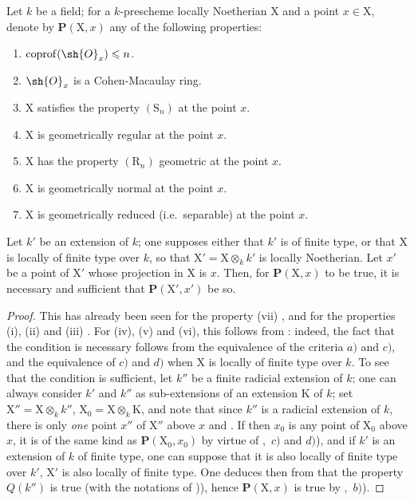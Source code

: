 \begin{corollary}[6.7.8]
\label{IV.6.7.8}
Let $k$ be a field; for a $k$-prescheme locally Noetherian $\mathrm{X}$ and a point $x\in\mathrm{X}$, denote by $\boldsymbol{P}(\mathrm{X},x)$ any of the following properties:
\begin{enumerate}[label=(\roman*)]
  \item $\operatorname{coprof}(\sh{O}_x)\leqslant n$.
  \item $\sh{O}_x$ is a Cohen-Macaulay ring.
  \item $\mathrm{X}$ satisfies the property $(\mathrm{S}_n)$ at the point $x$.
  \item $\mathrm{X}$ is geometrically regular at the point $x$.
  \item $\mathrm{X}$ has the property $(\mathrm{R}_n)$ geometric at the point $x$.
  \item $\mathrm{X}$ is geometrically normal at the point $x$.
  \item $\mathrm{X}$ is geometrically reduced (i.e.\ separable) at the point $x$.
\end{enumerate}
Let $k'$ be an extension of $k$; one supposes either that $k'$ is of finite type, or that $\mathrm{X}$ is locally of finite type over $k$, so that $\mathrm{X}'=\mathrm{X}\otimes_k k'$ is locally Noetherian. Let $x'$ be a point of $\mathrm{X}'$ whose projection in $\mathrm{X}$ is $x$. Then, for $\boldsymbol{P}(\mathrm{X},x)$ to be true, it is necessary and sufficient that $\boldsymbol{P}(\mathrm{X}',x')$ be so.
\end{corollary}

\begin{proof}
This has already been seen for the property (vii) , and for the properties (i), (ii) and (iii) . For (iv), (v) and (vi), this follows from : indeed, the fact that the condition is necessary follows from the equivalence of the criteria $a)$ and $c)$, and the equivalence of $c)$ and $d)$ when $\mathrm{X}$ is locally of finite type over $k$. To see that the condition is sufficient, let $k''$ be a finite radicial extension of $k$; one can always consider $k'$ and $k''$ as sub-extensions of an extension $\mathrm{K}$ of $k$; set $\mathrm{X}''=\mathrm{X}\otimes_k k''$, $\mathrm{X}_0=\mathrm{X}\otimes_k\mathrm{K}$, and note that since $k''$ is a radicial extension of $k$, there is only \emph{one} point $x''$ of $\mathrm{X}''$ above $x$  and . If then $x_0$ is any point of $\mathrm{X}_0$ above $x$, it is of the same kind as $\boldsymbol{P}(\mathrm{X}_0,x_0)$ by virtue of ,~$c)$ and $d)$), and if $k'$ is an extension of $k$ of finite type, one can suppose that it is also locally of finite type over $k'$, $\mathrm{X}'$ is also locally of finite type. One deduces then from  that the property $Q(k'')$ is true (with the notations of )), hence $\boldsymbol{P}(\mathrm{X},x)$ is true by ,~$b)$).
\end{proof}

